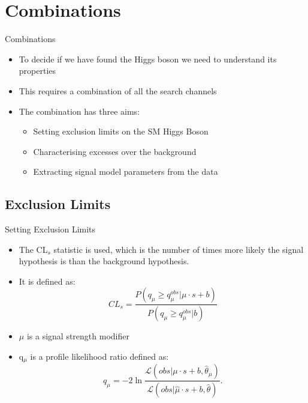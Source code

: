 \documentclass{beamer}
\begin{document}
\section{Combinations}
\begin{frame}{Combinations}
  \begin{itemize}
  \item To decide if we have found the Higgs boson we need to understand its properties
  \item This requires a combination of all the search channels
  \item The combination has three aims:
    \begin{itemize}
      \item<2-> Setting exclusion limits on the SM Higgs Boson
      \item<3-> Characterising excesses over the background
      \item<4-> Extracting signal model parameters from the data
    \end{itemize}
  \end{itemize}
\end{frame}


\subsection{Exclusion Limits}
\begin{frame}{Setting Exclusion Limits}
  \begin{itemize}
  \item The CL$_{s}$ statistic is used, which is the number of times more likely the signal hypothesis is than the background hypothesis.
  \item It is defined as:
    \begin{equation*}
    CL_{s} = \frac{P(q_{\mu}\geqslant q_{\mu}^{obs} | \mu \cdot s + b)}{P(q_{\mu}\geqslant q_{\mu}^{obs}|b)}
    \end{equation*}
  \item $\mu$ is a signal strength modifier
  \item q$_{\mu}$ is a profile likelihood ratio defined as:
    \begin{equation*}
      q_{\mu} = -2 \ln\frac{\mathcal{L}(obs|\mu \cdot s + b,\hat{\theta}_{\mu})}{\mathcal{L}(obs|\hat{\mu} \cdot s + b,\hat{\theta})}.
    \end{equation*}
  \end{itemize}
\end{frame}
\end{document}
